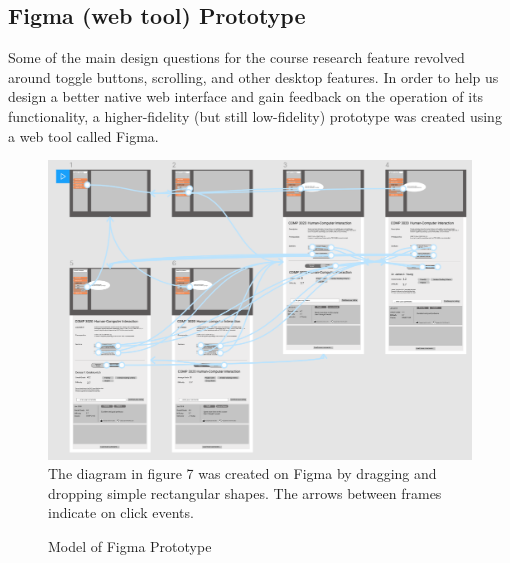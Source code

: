 \documentclass{article}
\begin{document}
\subsection{Figma (web tool) Prototype}
Some of the main design questions for the course research feature revolved around toggle buttons, scrolling, and other desktop features. In order to help us design a better native web interface and gain feedback on the operation of its functionality, a higher-fidelity (but still low-fidelity) prototype was created using a web tool called Figma. 

\begin{figure}[h]
\centering
\caption{Model of Figma Prototype}
\includegraphics[width=16cm]{ViewCourseInfo_Prototype/uiflow.png}
The diagram in figure 7 was created on Figma by dragging and dropping simple rectangular shapes. The arrows between frames indicate on click events. 
\end{figure}
\end{document}
